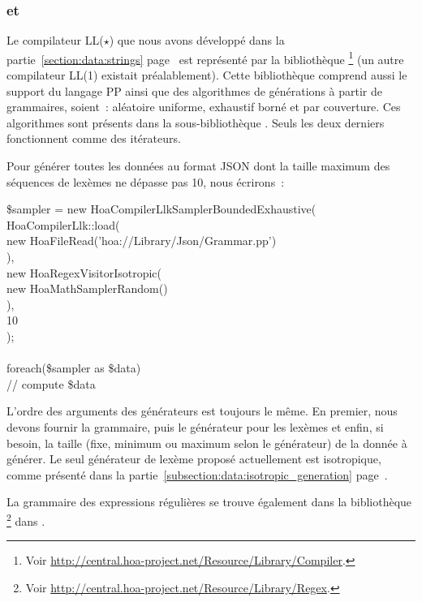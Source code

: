 \subsubsection{ et }

Le compilateur LL($\star$) que nous avons développé dans la
partie~\ref{section:data:strings} page~\pageref{section:data:strings} est
représenté par la bibliothèque
\footnote{Voir
\url{http://central.hoa-project.net/Resource/Library/Compiler}.} (un autre
compilateur LL(1) existait préalablement). Cette bibliothèque comprend aussi le
support du langage PP ainsi que des algorithmes de générations à partir de
grammaires, soient~: aléatoire uniforme, exhaustif borné et par couverture. Ces
algorithmes sont présents dans la sous-bibliothèque
.  Seuls les deux
derniers fonctionnent comme des itérateurs.

\begin{example}

Pour générer toutes les données au format JSON dont la taille maximum des
séquences de lexèmes ne dépasse pas 10, nous écrirons~:
%
\begin{pre}
\$sampler = new Hoa\bslash{}Compiler\bslash{}Llk\bslash{}Sampler\bslash{}BoundedExhaustive( \\
    Hoa\bslash{}Compiler\bslash{}Llk::load( \\
        new Hoa\bslash{}File\bslash{}Read('hoa://Library/Json/Grammar.pp') \\
    ), \\
    new Hoa\bslash{}Regex\bslash{}Visitor\bslash{}Isotropic( \\
        new Hoa\bslash{}Math\bslash{}Sampler\bslash{}Random() \\
    ), \\
    10 \\
); \\
 \\
foreach(\$sampler as \$data) \\
    // compute \$data
\end{pre}

L'ordre des arguments des générateurs est toujours le même. En premier, nous
devons fournir la grammaire, puis le générateur pour les lexèmes et enfin, si
besoin, la taille (fixe, minimum ou maximum selon le générateur) de la donnée à
générer. Le seul générateur de lexème proposé actuellement est isotropique,
comme présenté dans la partie~\ref{subsection:data:isotropic_generation}
page~\pageref{subsection:data:isotropic_generation}.

\end{example}

La grammaire des expressions régulières se trouve également dans la bibliothèque
\footnote{Voir
\url{http://central.hoa-project.net/Resource/Library/Regex}.} dans
.
